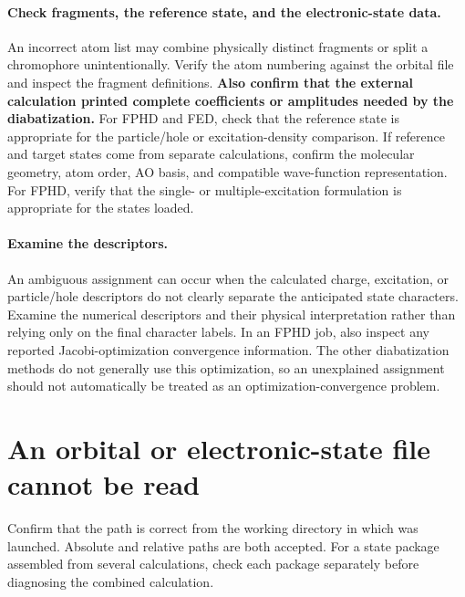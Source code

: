 \paragraph{Check fragments, the reference state, and the electronic-state data.}
An incorrect atom list may combine physically distinct fragments or split a chromophore unintentionally. Verify the atom numbering against the orbital file and inspect the fragment definitions. \textbf{Also confirm that the external calculation printed complete coefficients or amplitudes needed by the diabatization.} For FPHD and FED, check that the reference state is appropriate for the particle/hole or excitation-density comparison. If reference and target states come from separate calculations, confirm the molecular geometry, atom order, AO basis, and compatible wave-function representation. For FPHD, verify that the single- or multiple-excitation formulation is appropriate for the states loaded.

\paragraph{Examine the descriptors.}
An ambiguous assignment can occur when the calculated charge, excitation, or particle/hole descriptors do not clearly separate the anticipated state characters. Examine the numerical descriptors and their physical interpretation rather than relying only on the final character labels.
In an FPHD job, also inspect any reported Jacobi-optimization convergence information. The other diabatization methods do not generally use this optimization, so an unexplained assignment should not automatically be treated as an optimization-convergence problem.


\section{An orbital or electronic-state file cannot be read}
Confirm that the path is correct from the working directory in which \progname{} was launched. Absolute and relative paths are both accepted. For a state package assembled from several calculations, check each package separately before diagnosing the combined calculation.

